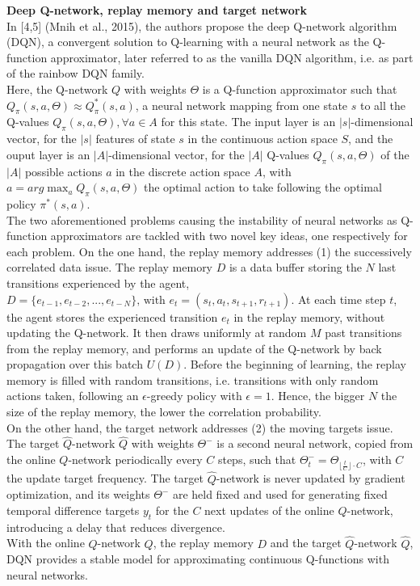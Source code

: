 \textbf{Deep Q-network, replay memory and target network} \\
In [4,5] (Mnih et al., 2015), the authors propose the deep Q-network algorithm (DQN), a convergent solution to Q-learning with a neural network as the Q-function approximator, later referred to as the vanilla DQN algorithm, i.e. as part of the rainbow DQN family. \\
Here, the Q-network $Q$ with weights $\Theta$ is a Q-function approximator such that $Q_{\pi}(s,a,\Theta) \approx Q^*_{\pi}(s,a)$, a neural network mapping from one state $s$ to all the Q-values $Q_{\pi}(s,a,\Theta), \forall a \in A$ for this state. The input layer is an $|s|$-dimensional vector, for the $|s|$ features of state $s$ in the continuous action space $S$, and the ouput layer is an $|A|$-dimensional vector, for the $|A|$ Q-values $Q_{\pi}(s,a,\Theta)$ of the $|A|$ possible actions $a$ in the discrete action space $A$, with $a = arg\max_a Q_{\pi}(s,a,\Theta)$ the optimal action to take following the optimal policy $\pi^*(s,a)$. \\
The two aforementioned problems causing the instability of neural networks as Q-function approximators are tackled with two novel key ideas, one respectively for each problem.
On the one hand, the replay memory addresses (1) the successively correlated data issue. The replay memory $D$ is a data buffer storing the $N$ last transitions experienced by the agent, $D = \{e_{t-1},e_{t-2},...,e_{t-N}\} \text{, with } e_t = (s_t,a_t,s_{t+1},r_{t+1})$. At each time step $t$, the agent stores the experienced transition $e_t$ in the replay memory, without updating the Q-network. It then draws uniformly at random $M$ past transitions from the replay memory, and performs an update of the Q-network by back propagation over this batch $U(D)$. Before the beginning of learning, the replay memory is filled with random transitions, i.e. transitions with only random actions taken, following an $\epsilon$-greedy policy with $\epsilon=1$. Hence, the bigger $N$ the size of the replay memory, the lower the correlation probability. \\
On the other hand, the target network addresses (2) the moving targets issue. The target $\hat{Q}$-network $\hat{Q}$ with weights $\Theta^-$ is a second neural network, copied from the online $Q$-network periodically every $C$ steps, such that $\Theta^-_t = \Theta_{\lfloor \frac{t}{C} \rfloor \cdot C}$, with $C$ the update target frequency. The target $\hat{Q}$-network is never updated by gradient optimization, and its weights $\Theta^-$ are held fixed and used for generating fixed temporal difference targets $y_t$ for the $C$ next updates of the online $Q$-network, introducing a delay that reduces divergence. \\
With the online $Q$-network $Q$, the replay memory $D$ and the target $\hat{Q}$-network $\hat{Q}$, DQN provides a stable model for approximating continuous Q-functions with neural networks. \\

